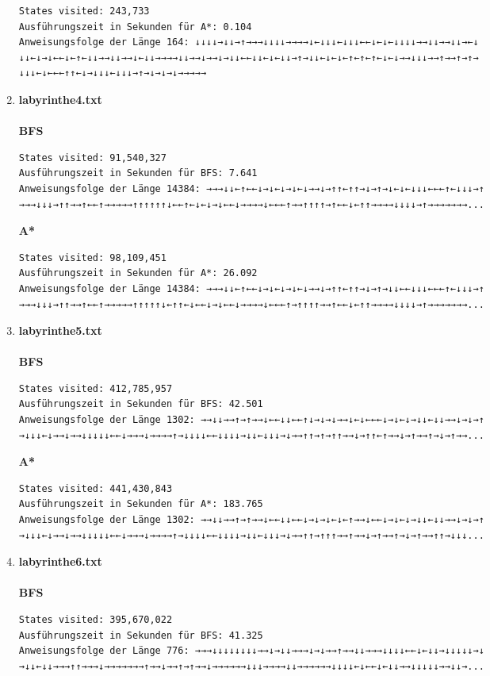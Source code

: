\documentclass[a4paper,10pt,ngerman]{scrartcl}
\begin{document}
\begin{enumerate}
\begin{verbatim}
States visited: 243,733
Ausführungszeit in Sekunden für A*: 0.104
Anweisungsfolge der Länge 164: ↓↓↓↓→↓↓→↑→→→↓↓↓↓→→→→↓←↓↓↓←↓↓↓←←↓←↓←↓↓↓↓→→↓↓→→↓↓→←↓
↓↓←↓→↓←←↓←↑←↓↓→→↓↓→→↓←↓↓→→→→↓↓→→↓→→↓→↓↓←←↓↓←↓←↓↓→↑→↓↓←↓←↓←↑←↑←↑←↓←↓→→↓↓↓→→↑→→↑→↑→
↓↓↓←↓←←←↑↑←↓→↓↓↓←↓↓↓→↑→↓→↓→↓→→→→→
\end{verbatim}
  \item \textbf{labyrinthe4.txt}\\
\\\textbf{BFS}
\begin{verbatim}
States visited: 91,540,327
Ausführungszeit in Sekunden für BFS: 7.641
Anweisungsfolge der Länge 14384: →→→↓↓←↑←←↓→↓←↓→↓←↓→→↓→↑↑←↑↑→↓→↑→↓←↓←↓↓↓←←←↑←↓↓↓→↑
→→→↓↓↓→↑↑→→↑←←↑→→→→→↑↑↑↑↑↑↓←←↑←↓←↓→↓←←↓→→→→↓←←←↑→→↑↑↑↑→↑←←↓←↑↑→→→→↓↓↓↓→↑→→→→→→→...
\end{verbatim}
\textbf{A*}
\begin{verbatim}
States visited: 98,109,451
Ausführungszeit in Sekunden für A*: 26.092
Anweisungsfolge der Länge 14384: →→→↓↓←↑←←↓→↓←↓→↓←↓→→↓→↑↑←↑↑→↓→↑→↓↓←←↓↓↓←←←↑←↓↓↓→↑
→→→↓↓↓→↑↑→→↑←←↑→→→→→↑↑↑↑↑↓←↑↑←↓←←↓→↓←←↓→→→→↓←←←↑→↑↑↑↑→→↑←←↓←↑↑→→→→↓↓↓↓→↑→→→→→→→...
\end{verbatim}
  \item \textbf{labyrinthe5.txt}\\
\\\textbf{BFS}
\begin{verbatim}
States visited: 412,785,957
Ausführungszeit in Sekunden für BFS: 42.501
Anweisungsfolge der Länge 1302: →→↓↓→→↑→↑→→↓←←↓↓←←↑↓→↓→↓→→↓←↓←←←↓→↓←↓→↓↓←↓↓→→↓→↓→↑
→↓↓↓←↓→→↓→→↓↓↓↓↓←←↓→→→↓→→→→↑→↓↓↓↓←←↓↓↓↓→↓↓←↓↓↓→↓→→↑↑→↑→↑↑→→↓→↑↑←↑→→↓→↑→→↑→↓→↑→→...
\end{verbatim}
\textbf{A*}
\begin{verbatim}
States visited: 441,430,843
Ausführungszeit in Sekunden für A*: 183.765
Anweisungsfolge der Länge 1302: →→↓↓→→↑→↑→→↓←←↓↓←←↓→↓→↓←↓←↑→→↓←←↓→↓←↓→↓↓←↓↓→→↓→↓→↑
→↓↓↓←↓→→↓→→↓↓↓↓↓←←↓→→→↓→→→→↑→↓↓↓↓←←↓↓↓↓→↓↓←↓↓↓→↓→→↑↑→↑↑↑→→↑→→↓→↑→→↑→↓→↑→→↑↑→↓↓↓...
\end{verbatim}
  \item \textbf{labyrinthe6.txt}\\
\\\textbf{BFS}
\begin{verbatim}
States visited: 395,670,022
Ausführungszeit in Sekunden für BFS: 41.325
Anweisungsfolge der Länge 776: →→→↓↓↓↓↓↓↓↓→→↓→↓↓→→→↓→↓→→↑→→↓↓→→→↓↓↓↓←←↓←↓↓→↓↓↓↓↓→↓
→↓↓←↓↓→→→↑↑→→→↓→→→→→→→↑→→↓→→↑→↑→→↓→→→→→→↓↓↓→→→→↓↓→→→→→→↓↓↓↓←↓←←↓←↓↓→→↓↓↓↓↓→→↓↓→...

\end{verbatim}
\end{enumerate}
\end{document}
